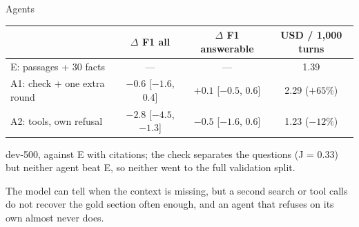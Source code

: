 \documentclass[aspectratio=169,11pt]{beamer}
\begin{document}
\begin{frame}{Agents}
\centering
\footnotesize
\renewcommand{\arraystretch}{1.25}
\begin{tabular}{lccc}
\toprule
 & $\Delta$ F1 all & $\Delta$ F1 answerable & USD / 1,000 turns \\
\midrule
E: passages + 30 facts & --- & --- & 1.39 \\ %
A1: check + one extra round & $-0.6$ [$-1.6$, 0.4] & $+0.1$ [$-0.5$, 0.6] & 2.29 ($+65\%$) \\ %
A2: tools, own refusal & $-2.8$ [$-4.5$, $-1.3$] & $-0.5$ [$-1.6$, 0.6] & 1.23 ($-12\%$) \\ %
\bottomrule
\end{tabular}

\vspace{4mm}
\footnotesize dev-500, against E with citations; the check separates the questions (J = 0.33) but neither agent beat E, so neither went to the full validation split.

\vspace{4mm}
\normalsize
The model can tell when the context is missing, but a second search or tool calls do not recover the gold section often enough, and an agent that refuses on its own almost never does.
\end{frame}
\end{document}
